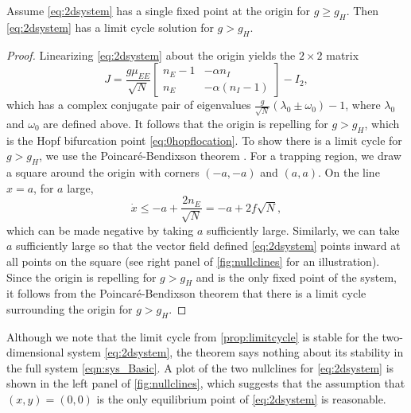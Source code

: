 \documentclass[reqno]{siamonline190516}
\begin{document}
\begin{proposition}\label{prop:limitcycle}
Assume \cref{eq:2dsystem} has a single fixed point at the origin for $g \geq g_H$. Then \cref{eq:2dsystem} has a limit cycle solution for $g > g_H$.
\begin{proof}
Linearizing \cref{eq:2dsystem} about the origin yields the $2 \times 2$ matrix
\[
J = \frac{g \mu_{EE}}{\sqrt{N}}
\begin{bmatrix} 
n_E - 1 & -\alpha n_I \\
n_E & -\alpha(n_I - 1)
\end{bmatrix} - I_2,
\]
which has a complex conjugate pair of eigenvalues $\frac{g}{\sqrt{N}}(\lambda_0 \pm \omega_0) - 1$, where $\lambda_0$ and $\omega_0$ are defined above. It follows that the origin is repelling for $g > g_H$, which is the Hopf bifurcation point \cref{eq:0hopflocation}. To show there is a limit cycle for $g > g_H$, we use the Poincar{\'e}-Bendixson theorem \cite[Chapter 16]{Coddington1955}. For a trapping region, we draw a square around the origin with corners $(-a, -a)$ and $(a, a)$. On the line $x = a$, for $a$ large,
\[
\dot{x} \leq -a + \frac{2 n_E}{\sqrt{N}} = -a + 2 f \sqrt{N},
\]
which can be made negative by taking $a$ sufficiently large. Similarly, we can take $a$ sufficiently large so that the vector field defined \cref{eq:2dsystem} points inward at all points on the square (see right panel of \cref{fig:nullclines} for an illustration). Since the origin is repelling for $g > g_H$ and is the only fixed point of the system, it follows from the Poincar{\'e}-Bendixson theorem that there is a limit cycle surrounding the origin for $g > g_H$. 
\end{proof}
\end{proposition}

Although we note that the limit cycle from \cref{prop:limitcycle} is stable for the two-dimensional system \cref{eq:2dsystem}, the theorem says nothing about its stability in the full system \cref{eqn:sys_Basic}. A plot of the two nullclines for \cref{eq:2dsystem} is shown in the left panel of \cref{fig:nullclines}, which suggests that the assumption that $(x,y) = (0,0)$ is the only equilibrium point of \cref{eq:2dsystem} is reasonable.

\end{document}
